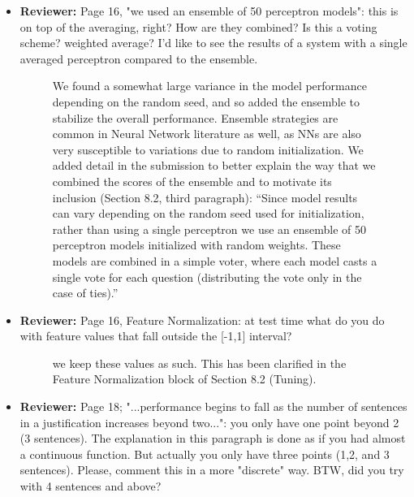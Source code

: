 \documentclass[10pt]{article}
\begin{document}
\begin{itemize}
\item \textbf{Reviewer:} Page 16, "we used an ensemble of 50 perceptron models": this is on top of
the averaging, right? How are they combined? Is this a voting scheme?
weighted average? I'd like to see the results of a system with a single
averaged perceptron compared to the ensemble.

\begin{figure}[H]
\caption{ We found a somewhat large variance in the model performance depending on the random seed, and so added the ensemble to stabilize the overall performance. Ensemble strategies are common in Neural Network literature as well, as NNs are also very susceptible to variations due to random initialization.
We added detail in the submission to better explain the way that we combined the scores of the ensemble and to motivate its inclusion (Section 8.2, third paragraph):
``Since model results can vary depending on the random seed used for initialization, rather than using a single perceptron we use an ensemble of 50 perceptron models initialized with random weights.  These models are combined in a simple voter, where each model casts a single vote for each question (distributing the vote only in the case of ties).''}
\label{resp:voting}
\end{figure}

\item \textbf{Reviewer:} Page 16, Feature Normalization: at test time what do you do with feature
values that fall outside the [-1,1] interval?

\begin{figure}[H]
\caption{ we keep these values as such. This has been clarified in the Feature Normalization block of Section 8.2 (Tuning).}
\end{figure}

\item \textbf{Reviewer:} Page 18; "...performance begins to fall as the number of sentences in a
justification increases beyond two...": you only have one point beyond 2 (3
sentences). The explanation in this paragraph is done as if you had almost a
continuous function. But actually you only have three points (1,2, and 3
sentences). Please, comment this in a more "discrete" way. BTW, did you try
with 4 sentences and above?



\end{itemize}
\end{document}
